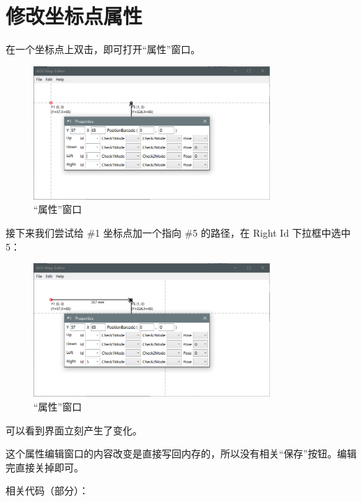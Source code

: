 \newpage

\section{修改坐标点属性}

在一个坐标点上双击，即可打开``属性''窗口。

\begin{figure}[H]
  \centering
  \includegraphics[width=0.8\textwidth]{assets/prop.png}
  \caption{``属性''窗口}
  \label{fig:prop}
\end{figure}

接下来我们尝试给 \#1 坐标点加一个指向 \#5 的路径，在 Right Id 下拉框中选中 5：

\begin{figure}[H]
  \centering
  \includegraphics[width=0.8\textwidth]{assets/prop2.png}
  \caption{``属性''窗口}
  \label{fig:prop2}
\end{figure}

可以看到界面立刻产生了变化。

这个属性编辑窗口的内容改变是直接写回内存的，所以没有相关``保存''按钮。编辑完直接关掉即可。

相关代码（部分）：

